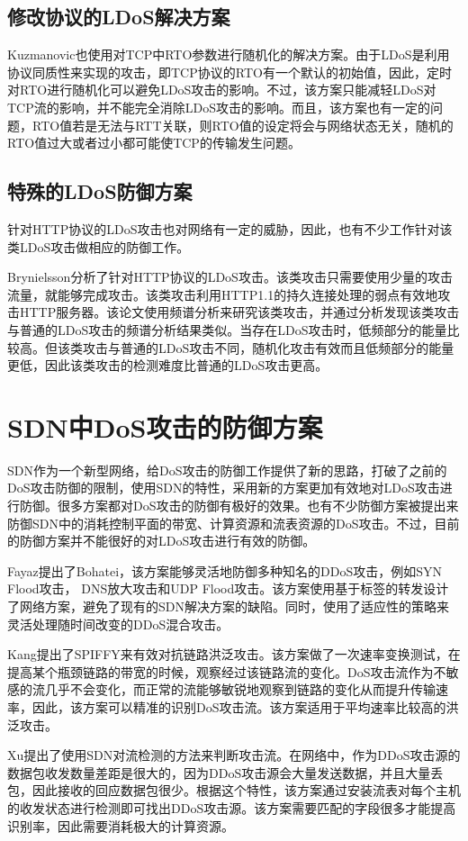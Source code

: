 \subsection{修改协议的LDoS解决方案}
\label{chap2:promodify}
Kuzmanovic\cite{Kuzmanovic2006Low}也使用对TCP中RTO参数进行随机化的解决方案。由于LDoS是利用协议同质性来实现的攻击，即TCP协议的RTO有一个默认的初始值，因此，定时对RTO进行随机化可以避免LDoS攻击的影响。不过，该方案只能减轻LDoS对TCP流的影响，并不能完全消除LDoS攻击的影响。而且，该方案也有一定的问题，RTO值若是无法与RTT关联，则RTO值的设定将会与网络状态无关，随机的RTO值过大或者过小都可能使TCP的传输发生问题。


\subsection{特殊的LDoS防御方案}
\label{chap2:special-LDoS-Defense}
针对HTTP协议的LDoS攻击也对网络有一定的威胁，因此，也有不少工作针对该类LDoS攻击做相应的防御工作。

Brynielsson\cite{brynielsson2015detectability}分析了针对HTTP协议的LDoS攻击。该类攻击只需要使用少量的攻击流量，就能够完成攻击。该类攻击利用HTTP1.1的持久连接处理的弱点有效地攻击HTTP服务器。该论文使用频谱分析来研究该类攻击，并通过分析发现该类攻击与普通的LDoS攻击的频谱分析结果类似。当存在LDoS攻击时，低频部分的能量比较高。但该类攻击与普通的LDoS攻击不同，随机化攻击有效而且低频部分的能量更低，因此该类攻击的检测难度比普通的LDoS攻击更高。






\section{SDN中DoS攻击的防御方案}
SDN作为一个新型网络，给DoS攻击的防御工作提供了新的思路，打破了之前的DoS攻击防御的限制，使用SDN的特性，采用新的方案更加有效地对LDoS攻击进行防御。很多方案\cite{b9, b16, b10}都对DoS攻击的防御有极好的效果。也有不少防御方案\cite{b10, b12, b13, b15, b18,wang2015floodguard,zhang2017ftguard}被提出来防御SDN中的消耗控制平面的带宽、计算资源和流表资源的DoS攻击\cite{shin2013avant,cao2017disrupting}。不过，目前的防御方案并不能很好的对LDoS攻击进行有效的防御。


Fayaz\cite{b9}提出了Bohatei，该方案能够灵活地防御多种知名的DDoS攻击，例如SYN Flood攻击， DNS放大攻击和UDP Flood攻击。该方案使用基于标签的转发设计了网络方案，避免了现有的SDN解决方案的缺陷。同时，使用了适应性的策略来灵活处理随时间改变的DDoS混合攻击。

Kang\cite{b16}提出了SPIFFY来有效对抗链路洪泛攻击。该方案做了一次速率变换测试，在提高某个瓶颈链路的带宽的时候，观察经过该链路流的变化。DoS攻击流作为不敏感的流几乎不会变化，而正常的流能够敏锐地观察到链路的变化从而提升传输速率，因此，该方案可以精准的识别DoS攻击流。该方案适用于平均速率比较高的洪泛攻击。

Xu\cite{b10}提出了使用SDN对流检测的方法来判断攻击流。在网络中，作为DDoS攻击源的数据包收发数量差距是很大的，因为DDoS攻击源会大量发送数据，并且大量丢包，因此接收的回应数据包很少。根据这个特性，该方案通过安装流表对每个主机的收发状态进行检测即可找出DDoS攻击源。该方案需要匹配的字段很多才能提高识别率，因此需要消耗极大的计算资源。


